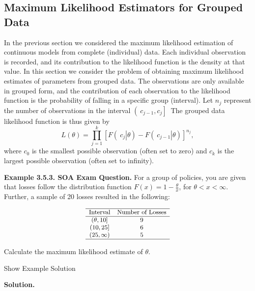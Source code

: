 \documentclass[]{book}
\theoremstyle{definition}
\theoremstyle{definition}
\theoremstyle{definition}
\theoremstyle{remark}
\begin{document}
\subsection{Maximum Likelihood Estimators for Grouped
Data}\label{MLEGrouped}

In the previous section we considered the maximum likelihood estimation
of continuous models from complete (individual) data. Each individual
observation is recorded, and its contribution to the likelihood function
is the density at that value. In this section we consider the problem of
obtaining maximum likelihood estimates of parameters from grouped data.
The observations are only available in grouped form, and the
contribution of each observation to the likelihood function is the
probability of falling in a specific group (interval). Let \(n_{j}\)
represent the number of observations in the interval
\(\left( \left. \ c_{j - 1},c_{j} \right\rbrack \right.\ \) The grouped
data likelihood function is thus given by
\[L\left( \theta \right) = \prod_{j = 1}^{k}\left\lbrack F\left( \left. \ c_{j} \right|\theta \right) - F\left( \left. \ c_{j - 1} \right|\theta \right) \right\rbrack^{n_{j}},\]
where \(c_{0}\) is the smallest possible observation (often set to zero)
and \(c_{k}\) is the largest possible observation (often set to
infinity).

\textbf{Example 3.5.3. SOA Exam Question.} For a group of policies, you
are given that losses follow the distribution function
\(F\left( x \right) = 1 - \frac{\theta}{x}\), for
\(\theta < x < \infty.\) Further, a sample of 20 losses resulted in the
following:

\[
{\small
\begin{matrix}\hline
\text{Interval} & \text{Number of Losses}  \\ \hline
(\theta, 10] & 9 \\
(10, 25] & 6 \\
(25, \infty) & 5  \\ \hline
\end{matrix}
}
\]

Calculate the maximum likelihood estimate of \(\theta\).

Show Example Solution

\hypertarget{toggleExampleLoss.5.3}{}
\textbf{Solution.}
\end{document}
